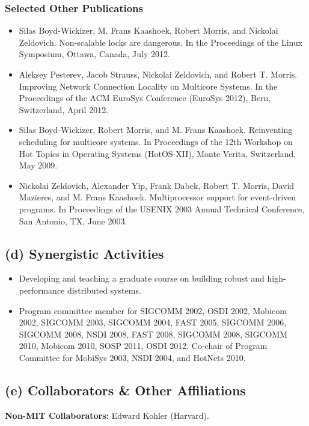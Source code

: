 \documentclass{article}
\begin{document}
\subsubsection*{Selected Other Publications}
\begin{itemize}

\item Silas Boyd-Wickizer, M. Frans Kaashoek, Robert Morris, and
  Nickolai Zeldovich. Non-scalable locks are dangerous. In the
  Proceedings of the Linux Symposium, Ottawa, Canada, July 2012.

\item Aleksey Pesterev, Jacob Strauss, Nickolai Zeldovich, and Robert
  T. Morris. Improving Network Connection Locality on Multicore
  Systems. In the Proceedings of the ACM EuroSys Conference (EuroSys
  2012), Bern, Switzerland, April 2012.

\item Silas Boyd-Wickizer, Robert Morris, and M. Frans Kaashoek.
  Reinventing scheduling for multicore systems. In Proceedings of the
  12th Workshop on Hot Topics in Operating Systems (HotOS-XII), Monte
  Verita, Switzerland, May 2009.

\item Nickolai Zeldovich, Alexander Yip, Frank Dabek, Robert T.
  Morris, David Mazieres, and M. Frans Kaashoek. Multiprocessor
  support for event-driven programs. In Proceedings of the USENIX 2003
  Annual Technical Conference, San Antonio, TX, June 2003.

\end{itemize}

\subsection*{(d) Synergistic Activities}

\begin{itemize}

\item Developing and teaching a graduate course on building robust and
high-performance distributed systems.
\item Program committee member for SIGCOMM 2002, OSDI 2002, Mobicom
  2002, SIGCOMM 2003, SIGCOMM 2004, FAST 2005, SIGCOMM 2006, SIGCOMM
  2008, NSDI 2008, FAST 2008, SIGCOMM 2008, SIGCOMM 2010, Mobicom 2010,
  SOSP 2011, OSDI 2012. Co-chair of Program Committee for MobiSys
  2003, NSDI 2004, and HotNets 2010.
\end{itemize}

\subsection*{(e) Collaborators \& Other Affiliations}
\noindent\textbf{Non-MIT Collaborators:}
    Edward Kohler (Harvard).
\end{document}
